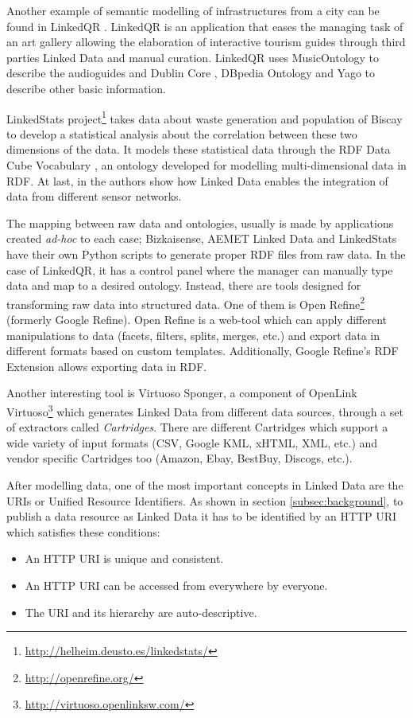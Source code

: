 Another example of semantic modelling of infrastructures from a city can be found in LinkedQR \cite{emaldi2012linkedqr}. LinkedQR is an application that eases the managing task of an art gallery allowing the elaboration of interactive tourism guides through third parties Linked Data and manual curation. LinkedQR uses MusicOntology \cite{raimond2007music} to describe the audioguides and Dublin Core \cite{weibel1998dublin}, DBpedia Ontology and Yago \cite{suchanek2007yago} to describe other basic information.

LinkedStats project\footnote{\url{http://helheim.deusto.es/linkedstats/}} takes data about waste generation and population of Biscay to develop a statistical analysis about the correlation between these two dimensions of the data. It models these statistical data through the RDF Data Cube Vocabulary \cite{_rdf_2013}, an ontology developed for modelling multi-dimensional data in RDF. At last, in \cite{stasch2011aggregating} the authors show how Linked Data enables the integration of data from different sensor networks.

The mapping between raw data and ontologies, usually is made by applications created \textit{ad-hoc} to each case; Bizkaisense, AEMET Linked Data and LinkedStats have their own Python scripts to generate proper RDF files from raw data. In the case of LinkedQR, it has a control panel where the manager can manually type data and map to a desired ontology. Instead, there are tools designed for transforming raw data into structured data. One of them is Open Refine\footnote{\url{http://openrefine.org/}} (formerly Google Refine). Open Refine is a web-tool which can apply different manipulations to data (facets, filters, splits, merges, etc.) and export data in different formats based on custom templates. Additionally, Google Refine's RDF Extension allows exporting data in RDF.

Another interesting tool is Virtuoso Sponger, a component of OpenLink Virtuoso\footnote{\url{http://virtuoso.openlinksw.com/}} which generates Linked Data from different data sources, through a set of extractors called \textit{Cartridges}. There are different Cartridges which support a wide variety of input formats (CSV, Google KML, xHTML, XML, etc.) and vendor specific Cartridges too (Amazon, Ebay, BestBuy, Discogs, etc.).

After modelling data, one of the most important concepts in Linked Data are the URIs or Unified Resource Identifiers. As shown in section \ref{subsec:background}, to publish a data resource as Linked Data it has to be identified by an HTTP URI which satisfies these conditions:
\begin{itemize}
    \item An HTTP URI is unique and consistent.
    \item An HTTP URI can be accessed from everywhere by everyone.
    \item The URI and its hierarchy are auto-descriptive.
\end{itemize}

